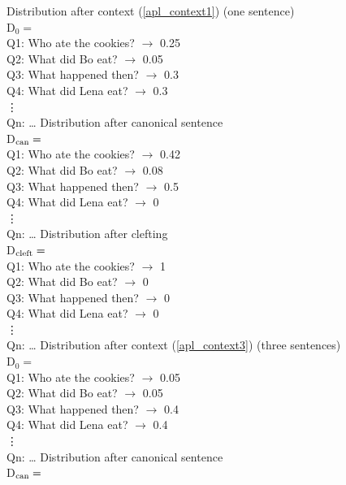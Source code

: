 \documentclass[output=paper,colorlinks,citecolor=brown]{langscibook}
\begin{document}
\ea\label{ex_d02} Distribution after context (\ref{apl_context1}) (one sentence)\\
D$_{0}=$\\
Q1: Who ate the cookies? $\rightarrow$ 0.25\\
Q2: What did Bo eat? $\rightarrow$ 0.05\\
Q3: What happened then? $\rightarrow$ 0.3\\
Q4: What did Lena eat? $\rightarrow$ 0.3\\
\hspace{3ex}\vdots\\
Qn: \dots
\ex\label{ex_d_can1}Distribution after canonical sentence\\
D$\textsubscript{can}=$\\
Q1: Who ate the cookies? $\rightarrow$ 0.42\\
Q2: What did Bo eat? $\rightarrow$ 0.08\\
Q3: What happened then? $\rightarrow$ 0.5\\
Q4: What did Lena eat? $\rightarrow$ 0\\
\hspace{3ex}\vdots\\
Qn: \dots
\ex Distribution after clefting\label{ex_d_cleft1}\\
D$\textsubscript{cleft}=$\\
Q1: Who ate the cookies? $\rightarrow$ 1\\
Q2: What did Bo eat? $\rightarrow$ 0\\
Q3: What happened then? $\rightarrow$ 0\\
Q4: What did Lena eat? $\rightarrow$ 0\\
\hspace{3ex}\vdots\\
Qn: \dots
\ex Distribution after context (\ref{apl_context3}) (three sentences)\\ 
\label{ex_d03}D$_{0}=$\\
Q1: Who ate the cookies? $\rightarrow$ 0.05\\
Q2: What did Bo eat? $\rightarrow$ 0.05\\
Q3: What happened then? $\rightarrow$ 0.4\\
Q4: What did Lena eat? $\rightarrow$ 0.4\\
\hspace{3ex}\vdots\\
Qn: \dots
\ex Distribution after canonical sentence\label{ex_d_can2}\\
D$\textsubscript{can}=$\\
\end{document}
